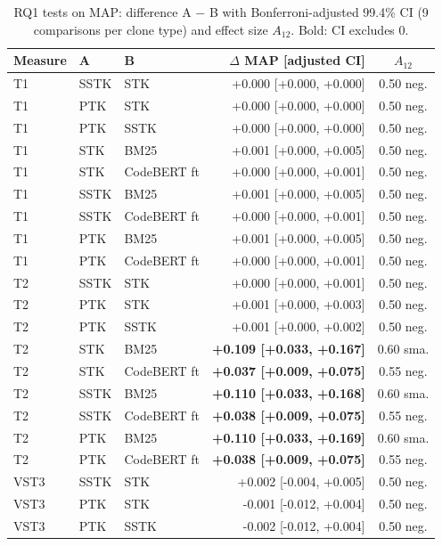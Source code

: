 \begin{table}[!htbp]
\centering
\caption{RQ1 tests on MAP: difference A $-$ B with Bonferroni-adjusted 99.4\% CI (9 comparisons per clone type) and effect size $A_{12}$. Bold: CI excludes 0.}
\label{tab:rq1effects}
\footnotesize
\setlength{\tabcolsep}{4pt}
\begin{tabular}{lllrc}
\toprule
Measure & A & B & $\Delta$ MAP [adjusted CI] & $A_{12}$ \\
\midrule
T1 & SSTK & STK & +0.000 [+0.000, +0.000] & 0.50 neg. \\
T1 & PTK & STK & +0.000 [+0.000, +0.000] & 0.50 neg. \\
T1 & PTK & SSTK & +0.000 [+0.000, +0.000] & 0.50 neg. \\
T1 & STK & BM25 & +0.001 [+0.000, +0.005] & 0.50 neg. \\
T1 & STK & CodeBERT ft & +0.000 [+0.000, +0.001] & 0.50 neg. \\
T1 & SSTK & BM25 & +0.001 [+0.000, +0.005] & 0.50 neg. \\
T1 & SSTK & CodeBERT ft & +0.000 [+0.000, +0.001] & 0.50 neg. \\
T1 & PTK & BM25 & +0.001 [+0.000, +0.005] & 0.50 neg. \\
T1 & PTK & CodeBERT ft & +0.000 [+0.000, +0.001] & 0.50 neg. \\
\midrule
T2 & SSTK & STK & +0.000 [+0.000, +0.001] & 0.50 neg. \\
T2 & PTK & STK & +0.001 [+0.000, +0.003] & 0.50 neg. \\
T2 & PTK & SSTK & +0.001 [+0.000, +0.002] & 0.50 neg. \\
T2 & STK & BM25 & \textbf{+0.109 [+0.033, +0.167]} & 0.60 sma. \\
T2 & STK & CodeBERT ft & \textbf{+0.037 [+0.009, +0.075]} & 0.55 neg. \\
T2 & SSTK & BM25 & \textbf{+0.110 [+0.033, +0.168]} & 0.60 sma. \\
T2 & SSTK & CodeBERT ft & \textbf{+0.038 [+0.009, +0.075]} & 0.55 neg. \\
T2 & PTK & BM25 & \textbf{+0.110 [+0.033, +0.169]} & 0.60 sma. \\
T2 & PTK & CodeBERT ft & \textbf{+0.038 [+0.009, +0.075]} & 0.55 neg. \\
\midrule
VST3 & SSTK & STK & +0.002 [-0.004, +0.005] & 0.50 neg. \\
VST3 & PTK & STK & -0.001 [-0.012, +0.004] & 0.50 neg. \\
VST3 & PTK & SSTK & -0.002 [-0.012, +0.004] & 0.50 neg. \\

\end{tabular}
\end{table}
